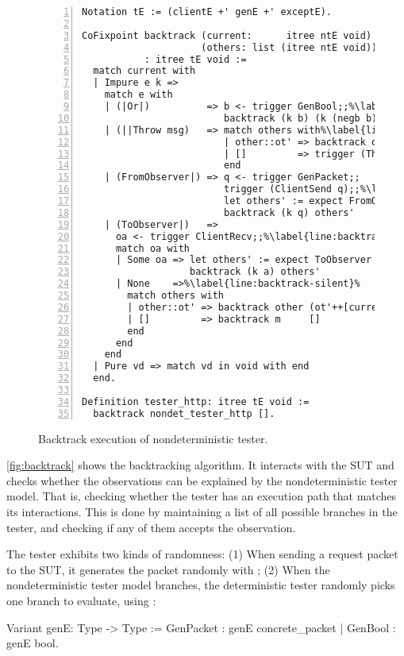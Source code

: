 \begin{figure}
\begin{lstlisting}[numbers=left]
Notation tE := (clientE +' genE +' exceptE).

CoFixpoint backtrack (current:      itree ntE void)
                     (others: list (itree ntE void))
           : itree tE void :=
  match current with
  | Impure e k =>
    match e with
    | (|Or|)          => b <- trigger GenBool;;%\label{line:backtrack-or}%
                         backtrack (k b) (k (negb b)::others)
    | (||Throw msg)   => match others with%\label{line:backtrack-throw}%
                         | other::ot' => backtrack other ot'
                         | []         => trigger (Throw msg)
                         end
    | (FromObserver|) => q <- trigger GenPacket;;
                         trigger (ClientSend q);;%\label{line:backtrack-send}%
                         let others' := expect FromObserver q others in
                         backtrack (k q) others'
    | (ToObserver|)   =>
      oa <- trigger ClientRecv;;%\label{line:backtrack-recv}%
      match oa with
      | Some oa => let others' := expect ToObserver a others in
                   backtrack (k a) others'
      | None    =>%\label{line:backtrack-silent}%
        match others with
        | other::ot' => backtrack other (ot'++[current]) (* postpone *)%\label{line:backtrack-postpone}%
        | []         => backtrack m     []               (* retry    *)
        end
      end
    end
  | Pure vd => match vd in void with end
  end.

Definition tester_http: itree tE void :=
  backtrack nondet_tester_http [].
\end{lstlisting}
\caption{Backtrack execution of nondeterministic tester.}
\label{fig:backtrack}
\end{figure}

\autoref{fig:backtrack} shows the backtracking algorithm.  It interacts with the
SUT and checks whether the observations can be explained by the nondeterministic
tester model.  That is, checking whether the tester has an execution path that
matches its interactions.  This is done by maintaining a list of all possible
branches in the tester, and checking if any of them accepts the observation.

The tester exhibits two kinds of randomness: (1) When sending a request packet
to the SUT, it generates the packet randomly with ; (2) When the
nondeterministic tester model branches, the deterministic tester randomly picks
one branch to evaluate, using :
\begin{coq}
  Variant genE: Type -> Type :=
    GenPacket : genE concrete_packet
  | GenBool   : genE bool.
\end{coq}

